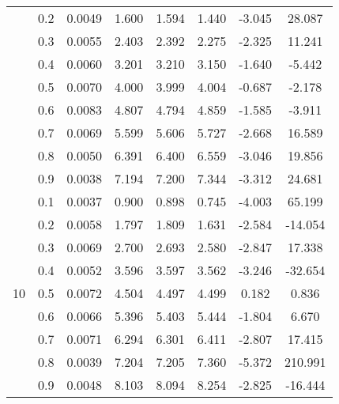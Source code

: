 \documentclass[11pt,a4paper]{report}
\begin{document}
\begin{longtable}{ | c | c || c | c | c | c | c | c | }
 & 0.2 & 0.0049 & 1.600 & 1.594 & 1.440 & -3.045 & 28.087 \\
 & 0.3 & 0.0055 & 2.403 & 2.392 & 2.275 & -2.325 & 11.241 \\
 & 0.4 & 0.0060 & 3.201 & 3.210 & 3.150 & -1.640 & -5.442 \\
 & 0.5 & 0.0070 & 4.000 & 3.999 & 4.004 & -0.687 & -2.178 \\
 & 0.6 & 0.0083 & 4.807 & 4.794 & 4.859 & -1.585 & -3.911 \\
 & 0.7 & 0.0069 & 5.599 & 5.606 & 5.727 & -2.668 & 16.589 \\
 & 0.8 & 0.0050 & 6.391 & 6.400 & 6.559 & -3.046 & 19.856 \\
 & 0.9 & 0.0038 & 7.194 & 7.200 & 7.344 & -3.312 & 24.681 \\
 \hline
\multirow{9}{*}{10} & 0.1 & 0.0037 & 0.900 & 0.898 & 0.745 & -4.003 & 65.199 \\
 & 0.2 & 0.0058 & 1.797 & 1.809 & 1.631 & -2.584 & -14.054 \\
 & 0.3 & 0.0069 & 2.700 & 2.693 & 2.580 & -2.847 & 17.338 \\
 & 0.4 & 0.0052 & 3.596 & 3.597 & 3.562 & -3.246 & -32.654 \\
 & 0.5 & 0.0072 & 4.504 & 4.497 & 4.499 & 0.182 & 0.836 \\
 & 0.6 & 0.0066 & 5.396 & 5.403 & 5.444 & -1.804 & 6.670 \\
 & 0.7 & 0.0071 & 6.294 & 6.301 & 6.411 & -2.807 & 17.415 \\
 & 0.8 & 0.0039 & 7.204 & 7.205 & 7.360 & -5.372 & 210.991 \\
 & 0.9 & 0.0048 & 8.103 & 8.094 & 8.254 & -2.825 & -16.444 \\
 \hline
\hline
\end{longtable}
\end{document}
